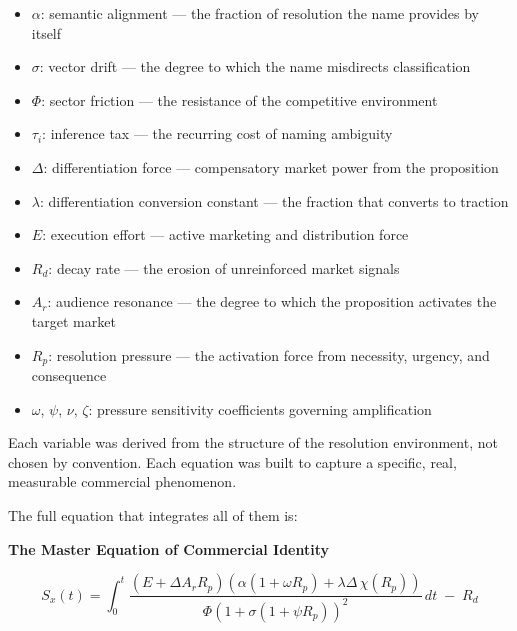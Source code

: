 \documentclass[12pt, openany]{book}
\theoremstyle{thmstyle}
\theoremstyle{defstyle}
\begin{document}
\begin{itemize}[leftmargin=1.5em]
  \item $\alpha$: semantic alignment --- the fraction of resolution the name provides by itself
  \item $\sigma$: vector drift --- the degree to which the name misdirects classification
  \item $\Phi$: sector friction --- the resistance of the competitive environment
  \item $\tau_i$: inference tax --- the recurring cost of naming ambiguity
  \item $\Delta$: differentiation force --- compensatory market power from the proposition
  \item $\lambda$: differentiation conversion constant --- the fraction that converts to traction
  \item $E$: execution effort --- active marketing and distribution force
  \item $R_d$: decay rate --- the erosion of unreinforced market signals
  \item $A_r$: audience resonance --- the degree to which the proposition activates the target market
  \item $R_p$: resolution pressure --- the activation force from necessity, urgency, and consequence
  \item $\omega$, $\psi$, $\nu$, $\zeta$: pressure sensitivity coefficients governing amplification
\end{itemize}

Each variable was derived from the structure of the resolution environment, not chosen by convention. Each equation was built to capture a specific, real, measurable commercial phenomenon.

The full equation that integrates all of them is:

\begin{masterbox}
\begin{center}
\textbf{The Master Equation of Commercial Identity}
\end{center}
\vspace{6pt}
\begin{equation}
\boxed{
S_x(t) = \int_0^t
\frac{
\left(E + \Delta A_r R_p\right)
\left(\alpha(1 + \omega R_p) + \lambda\Delta\,\chi(R_p)\right)
}{
\Phi\left(1 + \sigma(1 + \psi R_p)\right)^2
}
\, dt \; - \; R_d
}
\label{eq:master_final}
\end{equation}
\vspace{2pt}
\end{masterbox}
\end{document}

